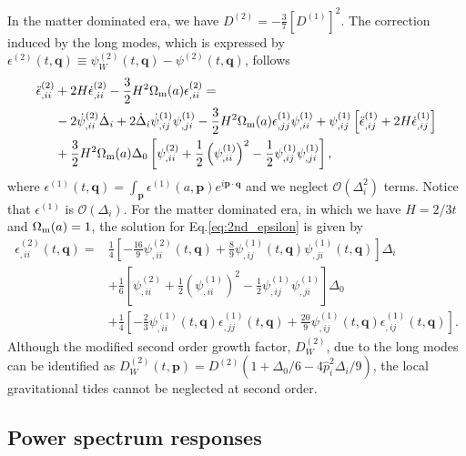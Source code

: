 \documentclass[a4paper,11pt]{article}
\newcommand{\vq}{{\bm q}}
\newcommand{\vp}{{\bm p}}
\begin{document}
In the matter dominated era, we have $D^{(2)}= -\frac37 \left[D^{(1)}\right]^2$.
The correction induced by the long modes, which is expressed by $\epsilon^{(2)}(t, \vq)\equiv \psi_W^{(2)}(t, \vq) - \psi^{(2)}(t, \vq)$,
follows
\begin{align}
\ddot \epsilon^{(2)}_{,ii} &+ 2H \dot \epsilon^{(2)}_{,ii} - \frac32 H^2 \Omega_{\rm m}(a) \epsilon_{,ii}^{(2)}=
\nonumber\\
&-2\dot\psi^{(2)}_{,ii} \dot\Delta_i + 2\dot\Delta_i\dot\psi_{,ij}^{(1)}\psi_{,ji}^{(1)}
-\frac32 H^2 \Omega_{\rm m}(a) \epsilon^{(1)}_{,jj}\psi^{(1)}_{,ii} + \psi^{(1)}_{,ij} \left[ \ddot\epsilon_{,ij}^{(1)} + 2H\dot\epsilon_{,ij}^{(1)} \right]
\nonumber\\
&+\frac32 H^2 \Omega_{\rm m}(a)\Delta_0\left[ \psi_{,ii}^{(2)} + \frac12\left( \psi^{(1)}_{,ii}\right)^2- \frac12\psi^{(1)}_{,ij}\psi^{(1)}_{,ji} \right],
\label{eq:2nd_epsilon}
\end{align}
where $\epsilon^{(1)}(t,\vq) = \int_\vp \epsilon^{(1)}(a, \vp)e^{i\vp\cdot\vq}$
and we neglect $\mathcal{O}(\Delta_i^2)$ terms.
Notice that $\epsilon^{(1)}$ is $\mathcal{O}(\Delta_i)$.
For the matter dominated era, in which we have $H=2/3t$ and $\Omega_{\rm m}(a)=1$,
the solution for Eq.\eqref{eq:2nd_epsilon} is given by
\begin{align}
\epsilon^{(2)}_{,ii}(t, \vq)
=&\frac14 \left[-\frac{16}{9}\psi^{(2)}_{,ii}(t,\vq) + \frac89\psi^{(1)}_{,ij}(t,\vq)\psi^{(1)}_{,ji}(t,\vq) \right]\Delta_i
\nonumber\\
&+\frac16 \left[\psi_{,ii}^{(2)} + \frac12\left( \psi^{(1)}_{,ii}\right)^2- \frac12\psi^{(1)}_{,ij}\psi^{(1)}_{,ji}   \right]\Delta_0
\nonumber\\
&+\frac14\left[-\frac23\psi^{(1)}_{,ii}(t,\vq)\epsilon_{,jj}^{(1)}(t,\vq) + \frac{20}{9}\psi^{(1)}_{,ij}(t,\vq)\epsilon_{,ij}^{(1)}(t,\vq)  \right].
\end{align}
Although the modified second order growth factor, $D^{(2)}_W$, due to the long modes can be identified as $D^{(2)}_W (t, \vp) = D^{(2)}(1 + \Delta_0/6 - 4\hat{p}_i^2\Delta_i/9 )$, the local gravitational tides cannot be neglected at second order.


\subsection{Power spectrum responses}
\label{sub:resp}
\end{document}
